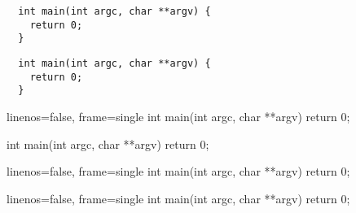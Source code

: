 \documentclass{article}
\begin{document}
\begin{verbatim}
  int main(int argc, char **argv) {
    return 0;
  }
\end{verbatim}
\begin{verbatim}
  int main(int argc, char **argv) {
    return 0;
  }
\end{verbatim}

\begin{cppcode}{
  linenos=false, frame=single
}
  int main(int argc, char **argv) {
    return 0;
  }
\end{cppcode}

\begin{cppcode*}[
  linenos=false, frame=single
]
  int main(int argc, char **argv) {
    return 0;
  }
\end{cppcode*}

\begin{cppcode}{linenos=false, frame=single}
  int main(int argc, char **argv) {
    return 0;
  }
\end{cppcode}

\begin{cppcode*}{linenos=false, frame=single}
  int main(int argc, char **argv) {
    return 0;
  }
\end{cppcode*}
\end{document}

